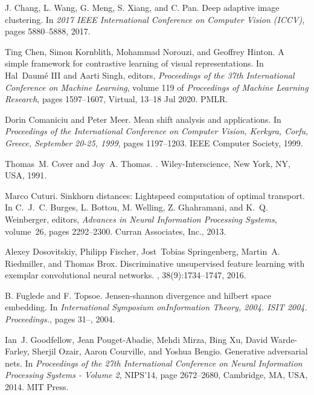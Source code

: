 \documentclass[journal]{IEEEtran}
\begin{document}
{\begin{thebibliography}{10}
J. {Chang}, L. {Wang}, G. {Meng}, S. {Xiang}, and C. {Pan}.
\newblock Deep adaptive image clustering.
\newblock In {\em 2017 IEEE International Conference on Computer Vision
  (ICCV)}, pages 5880--5888, 2017.

Ting Chen, Simon Kornblith, Mohammad Norouzi, and Geoffrey Hinton.
\newblock A simple framework for contrastive learning of visual
  representations.
\newblock In Hal~Daumé III and Aarti Singh, editors, {\em Proceedings of the
  37th International Conference on Machine Learning}, volume 119 of {\em
  Proceedings of Machine Learning Research}, pages 1597--1607, Virtual, 13--18
  Jul 2020. PMLR.

Dorin Comaniciu and Peter Meer.
\newblock Mean shift analysis and applications.
\newblock In {\em Proceedings of the International Conference on Computer
  Vision, Kerkyra, Corfu, Greece, September 20-25, 1999}, pages 1197--1203.
  {IEEE} Computer Society, 1999.

Thomas~M. Cover and Joy~A. Thomas.
.
\newblock Wiley-Interscience, New York, NY, USA, 1991.

Marco Cuturi.
\newblock Sinkhorn distances: Lightspeed computation of optimal transport.
\newblock In C.~J.~C. Burges, L. Bottou, M. Welling, Z. Ghahramani, and K.~Q.
  Weinberger, editors, {\em Advances in Neural Information Processing Systems},
  volume~26, pages 2292--2300. Curran Associates, Inc., 2013.

Alexey Dosovitskiy, Philipp Fischer, Jost~Tobias Springenberg, Martin~A.
  Riedmiller, and Thomas Brox.
\newblock Discriminative unsupervised feature learning with exemplar
  convolutional neural networks.
, 38(9):1734--1747,
  2016.

B. {Fuglede} and F. {Topsoe}.
\newblock Jensen-shannon divergence and hilbert space embedding.
\newblock In {\em International Symposium onInformation Theory, 2004. ISIT
  2004. Proceedings.}, pages 31--, 2004.

Ian~J. Goodfellow, Jean Pouget-Abadie, Mehdi Mirza, Bing Xu, David
  Warde-Farley, Sherjil Ozair, Aaron Courville, and Yoshua Bengio.
\newblock Generative adversarial nets.
\newblock In {\em Proceedings of the 27th International Conference on Neural
  Information Processing Systems - Volume 2}, NIPS'14, page 2672–2680,
  Cambridge, MA, USA, 2014. MIT Press.


\end{thebibliography}}
\end{document}
